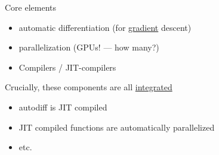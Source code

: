 \documentclass[
    xcolor={svgnames,dvipsnames},
    hyperref={colorlinks, citecolor=DeepPink4, linkcolor=DarkRed, urlcolor=DarkBlue}
    ]{beamer}  %
\newcommand{\1}{\mathbbm 1}
\begin{document}
\begin{frame}
    

    Core elements
    \begin{itemize}
        \item automatic differentiation (for \underline{gradient} descent)
        \vspace{0.5em}
        \item parallelization (GPUs! --- how many?)
        \vspace{0.5em}
        \item Compilers / JIT-compilers
    \end{itemize}

        \vspace{0.5em}
        \vspace{0.5em}
        \pause
    Crucially, these components are all \underline{integrated}

    \begin{itemize}
        \item autodiff is JIT compiled
        \vspace{0.5em}
        \item JIT compiled functions are automatically parallelized
        \vspace{0.5em}
        \item etc.
    \end{itemize}

\end{frame}


\begin{frame}
    

    \begin{figure}
       \begin{center}
       \end{center}
    \end{figure}


\end{frame}
\end{document}
